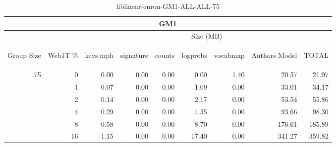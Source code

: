 \begin{center}
\begin{table}[htbp] 
 \begin{center}
\begin{tabular}{ | r | r | r | r | r | r | r | r | r |}
\hline
\multicolumn{9}{|c|}{GM1}\\
\hline
 & & \multicolumn{7}{|c|}{Size (MB)}\\ \cline{3-9}
\begin{sideways}Group Size\end{sideways} & \begin{sideways}Web1T \% \end{sideways} & \begin{sideways}keys.mph\end{sideways} & \begin{sideways}signature\end{sideways} & \begin{sideways}counts\end{sideways} & \begin{sideways}logprobs\end{sideways} & \begin{sideways}vocabmap\end{sideways} & \begin{sideways}Authors Model \end{sideways} & \begin{sideways}TOTAL\end{sideways}\\
\hline
\multirow{5}{*}{75}
 & 0 & 0.00 & 0.00 & 0.00 & 0.00 & 1.40 & 20.57 & 21.97\\ \cline{2-9}
 & 1 & 0.07 & 0.00 & 0.00 & 1.09 & 0.00 & 33.01 & 34.17\\ \cline{2-9}
 & 2 & 0.14 & 0.00 & 0.00 & 2.17 & 0.00 & 53.54 & 55.86\\ \cline{2-9}
 & 4 & 0.29 & 0.00 & 0.00 & 4.35 & 0.00 & 93.66 & 98.30\\ \cline{2-9}
 & 8 & 0.58 & 0.00 & 0.00 & 8.70 & 0.00 & 176.61 & 185.89\\ \cline{2-9}
 & 16 & 1.15 & 0.00 & 0.00 & 17.40 & 0.00 & 341.27 & 359.82\\ \cline{2-9}
\hline
\end{tabular}
\caption{liblinear-enron-GM1-ALL-ALL-75}
\label{table:liblinear-enron-GM1-ALL-ALL-75}
\end{center}
 \end{table}
\end{center}

